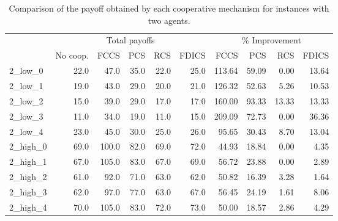 \documentclass{article}
\begin{document}
\begin{table}[ht!]
\centering
\caption{Comparison of the payoff obtained by each cooperative mechanism for instances with two agents. \label{tb:2_payoffs}}
\begin{adjustbox}{max width=\textwidth}
\begin{tabular}{lrrrrrrrrr}
\toprule & \multicolumn{5}{c}{Total payoffs}            & \multicolumn{4}{|c}{\% Improvement} \\
           & No coop. & FCCS  & PCS  & RCS  & FDICS &\multicolumn{1}{|r}{FCCS}    & PCS    & RCS    & FDICS   \\
\midrule
2\_low\_0  & 22.0     & 47.0  & 35.0 & 22.0 & 25.0 & 113.64  & 59.09  & 0.00   & 13.64  \\
2\_low\_1  & 19.0     & 43.0  & 29.0 & 20.0 & 21.0 & 126.32  & 52.63  & 5.26   & 10.53  \\
2\_low\_2  & 15.0     & 39.0  & 29.0 & 17.0 & 17.0 & 160.00  & 93.33  & 13.33  & 13.33  \\
2\_low\_3  & 11.0     & 34.0  & 19.0 & 11.0 & 15.0 & 209.09  & 72.73  & 0.00   & 36.36  \\
2\_low\_4  & 23.0     & 45.0  & 30.0 & 25.0 & 26.0 & 95.65   & 30.43  & 8.70   & 13.04  \\
2\_high\_0 & 69.0     & 100.0 & 82.0 & 69.0 & 72.0 & 44.93   & 18.84  & 0.00   & 4.35   \\
2\_high\_1 & 67.0     & 105.0 & 83.0 & 67.0 & 69.0 & 56.72   & 23.88  & 0.00   & 2.89   \\
2\_high\_2 & 61.0     & 92.0  & 71.0 & 63.0 & 62.0 & 50.82   & 16.39  & 3.28   & 1.64   \\
2\_high\_3 & 62.0     & 97.0  & 77.0 & 63.0 & 67.0 & 56.45   & 24.19  & 1.61   & 8.06   \\
2\_high\_4 & 70.0     & 105.0 & 83.0 & 72.0 & 73.0 & 50.00   & 18.57  & 2.86   & 4.29  \\
\bottomrule
\end{tabular}
\end{adjustbox}
\end{table}
\end{document}
